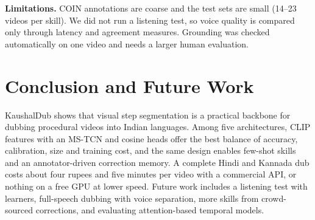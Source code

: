 \documentclass[conference]{IEEEtran}
\begin{document}
\textbf{Limitations.} COIN annotations are coarse and the test sets are small (14--23 videos per skill). We did not run a
listening test, so voice quality is compared only through latency and agreement measures. Grounding was checked
automatically on one video and needs a larger human evaluation.

\section{Conclusion and Future Work}
KaushalDub shows that visual step segmentation is a practical backbone for dubbing procedural videos into Indian
languages. Among five architectures, CLIP features with an MS-TCN and cosine heads offer the best balance of accuracy,
calibration, size and training cost, and the same design enables few-shot skills and an annotator-driven correction
memory. A complete Hindi and Kannada dub costs about four rupees and five minutes per video with a commercial API, or
nothing on a free GPU at lower speed. Future work includes a listening test with learners, full-speech dubbing with
voice separation, more skills from crowd-sourced corrections, and evaluating attention-based temporal models.
\end{document}
